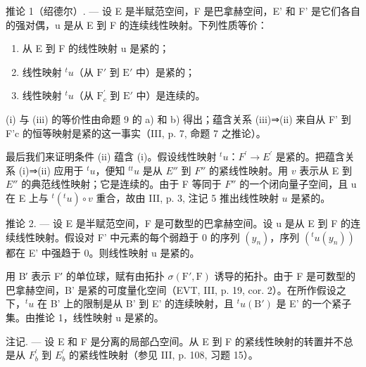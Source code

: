 推论 1（绍德尔）. --- 设 E 是半赋范空间，F 是巴拿赫空间，E' 和 F' 是它们各自的强对偶，u 是从 E 到 F 的连续线性映射。下列性质等价：

\begin{enumerate}
\def\labelenumi{(\roman{enumi})}
\item
  从 E 到 F 的线性映射 u 是紧的；
\item
  线性映射 \({}^{t}u\)（从 \(\mathrm{F}'\) 到 \(\mathrm{E}'\) 中）是紧的；
\item
  线性映射 \({}^{t}u\)（从 \(\mathrm{F}_{c}^{\prime}\) 到 \(\mathrm{E}'\) 中）是连续的。
\end{enumerate}

(i) 与 (iii) 的等价性由命题 9 的 a) 和 b) 得出；蕴含关系 (iii)⇒(ii) 来自从 F' 到 F'c 的恒等映射是紧的这一事实（III, p. 7, 命题 7 之推论）。

最后我们来证明条件 (ii) 蕴含 (i)。假设线性映射 \({}^{t}u\)：\(F^{\prime} \to E^{\prime}\) 是紧的。把蕴含关系 (i)⇒(ii) 应用于 \({}^{t}u\)，便知 \({}^{tt}u\) 是从 \(E''\) 到 \(F''\) 的紧线性映射。用 \(v\) 表示从 E 到 \(E''\) 的典范线性映射；它是连续的。由于 F 等同于 \(F''\) 的一个闭向量子空间，且 u 在 E 上与 \({}^{t}({}^{t}u) \circ v\) 重合，故由 III, p. 3, 注记 5 推出线性映射 \(u\) 是紧的。

推论 2. --- 设 E 是半赋范空间，F 是可数型的巴拿赫空间。设 u 是从 E 到 F 的连续线性映射。假设对 F' 中元素的每个弱趋于 0 的序列 \((y_{n})\)，序列 \((^{t}u(y_{n}))\) 都在 E' 中强趋于 0。则线性映射 u 是紧的。

用 B′ 表示 F′ 的单位球，赋有由拓扑 \(\sigma(\mathrm{F}',\mathrm{F})\) 诱导的拓扑。由于 F 是可数型的巴拿赫空间，B' 是紧的可度量化空间（EVT, III, p. 19, cor. 2）。在所作假设之下，\({}^{t}u\) 在 B' 上的限制是从 B' 到 E' 的连续映射，且 \({}^{t}u(\mathrm{B}')\) 是 E' 的一个紧子集。由推论 1，线性映射 u 是紧的。

注记. --- 设 E 和 F 是分离的局部凸空间。从 E 到 F 的紧线性映射的转置并不总是从 \(F_{b}^{\prime}\) 到 \(E_{b}^{\prime}\) 的紧线性映射（参见 III, p. 108, 习题 15）。

